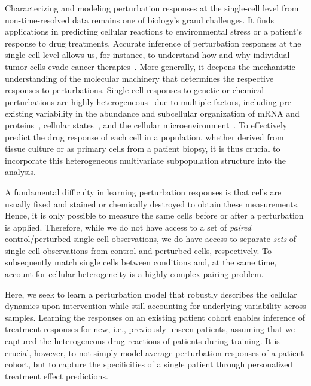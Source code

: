 Characterizing and modeling perturbation responses at the single-cell level from non-time-resolved data remains one of biology's grand challenges. It finds applications in predicting cellular reactions to environmental stress or a patient's response to drug treatments. Accurate inference of perturbation responses at the single cell level allows us, for instance, to understand how and why individual tumor cells evade cancer therapies~\citep{frangieh2021multimodal}. More generally, it deepens the mechanistic understanding of the molecular machinery that determines the respective responses to perturbations. Single-cell responses to genetic or chemical perturbations are  highly heterogeneous~\citep{liberali2014hierarchical} due to multiple factors, including pre-existing variability in the abundance and subcellular organization of mRNA and proteins~\citep{battich2013image, battich2015control, gut2018multiplexed, shaffer2017rare}, cellular states~\citep{kramer2019cellular}, and the cellular microenvironment~\citep{snijder2009population}. To effectively predict the drug response of each cell in a  population, whether derived from tissue culture or as primary cells from a patient biopsy, it is thus crucial to incorporate this heterogeneous multivariate subpopulation structure into the analysis.

 A fundamental difficulty in learning perturbation responses is that cells are usually fixed and stained or chemically destroyed to obtain these measurements. Hence, it is only possible to measure the same cells  before or after a perturbation is applied. 
Therefore, while we do not have access to a set of {\em paired} control/perturbed single-cell observations, we do have access to separate \emph{sets} of single-cell observations from control and perturbed cells, respectively. To subsequently match single cells between conditions and, at the same time, account for cellular heterogeneity is a highly complex pairing problem.

Here, we seek to learn a perturbation model that robustly describes the cellular dynamics upon intervention while still accounting for underlying variability across samples. Learning the responses on an existing patient cohort enables inference of treatment responses for new, i.e., previously unseen patients, assuming that we captured the heterogeneous drug reactions of patients during training.
It is crucial, however, to not simply model average perturbation responses of a patient cohort, but to capture the specificities of a single patient through personalized treatment effect predictions.

